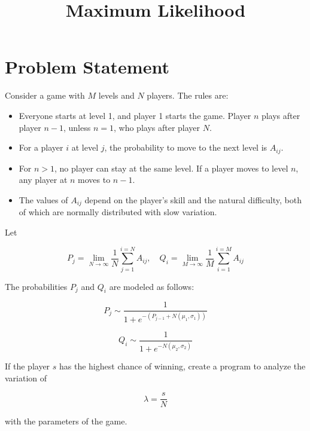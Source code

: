 \documentclass{article}
\begin{document}
\title{Maximum Likelihood}
\author{}
\date{}
\maketitle

\section*{Problem Statement}

Consider a game with $M$ levels and $N$ players. The rules are:
\begin{itemize}
    \item Everyone starts at level 1, and player 1 starts the game. Player $n$ plays after player $n-1$, unless $n=1$, who plays after player $N$.
    \item For a player $i$ at level $j$, the probability to move to the next level is $A_{ij}$.
    \item For $n > 1$, no player can stay at the same level. If a player moves to level $n$, any player at $n$ moves to $n-1$.
    \item The values of $A_{ij}$ depend on the player's skill and the natural difficulty, both of which are normally distributed with slow variation.
\end{itemize}

Let 


\[
P_j = \lim_{N \rightarrow \infty} \frac{1}{N} \sum_{j=1}^{i=N} A_{ij}, \quad Q_i = \lim_{M \rightarrow \infty} \frac{1}{M} \sum_{i=1}^{i=M} A_{ij}
\]



The probabilities $P_j$ and $Q_i$ are modeled as follows:


\[
P_j \sim \frac{1}{1 + e^{-\left( P_{j-1} + N(\mu_1, \sigma_1) \right)}}
\]




\[
Q_i \sim \frac{1}{1 + e^{-N(\mu_2, \sigma_2)}}
\]



If the player $s$ has the highest chance of winning, create a program to analyze the variation of 


\[
\lambda = \frac{s}{N}
\]


with the parameters of the game.
\end{document}

